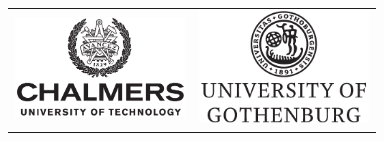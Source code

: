 \documentclass[10pt,a4paper,onecolumn,english]{book}
\begin{document}
\vfill

\begin{center}
\begin{tabular}[h]{ c c }
  \vspace{0pt}\includegraphics[width=45mm]{figures/chalmers_logo.pdf}
  &
  \vspace{0pt}\includegraphics[width=45mm]{figures/gu_logo.pdf}
\end{tabular}
\end{center}


\newpage
\thispagestyle{empty}


\end{document}
